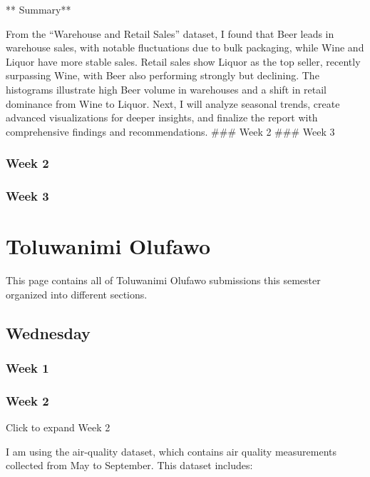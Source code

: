 \documentclass[
  letterpaper,
  DIV=11,
  numbers=noendperiod]{scrreprt}
\begin{document}
** Summary**

From the ``Warehouse and Retail Sales'' dataset, I found that Beer leads
in warehouse sales, with notable fluctuations due to bulk packaging,
while Wine and Liquor have more stable sales. Retail sales show Liquor
as the top seller, recently surpassing Wine, with Beer also performing
strongly but declining. The histograms illustrate high Beer volume in
warehouses and a shift in retail dominance from Wine to Liquor. Next, I
will analyze seasonal trends, create advanced visualizations for deeper
insights, and finalize the report with comprehensive findings and
recommendations. \#\#\# Week 2 \#\#\# Week 3

\subsection{Week 2}\label{week-2-8}

\subsection{Week 3}\label{week-3-7}


\chapter{Toluwanimi Olufawo}\label{toluwanimi-olufawo}

This page contains all of Toluwanimi Olufawo submissions this semester
organized into different sections.

\section{Wednesday}\label{wednesday-3}

\subsection{Week 1}\label{week-1-9}

\subsection{Week 2}\label{week-2-9}

Click to expand Week 2

I am using the air-quality dataset, which contains air quality
measurements collected from May to September. This dataset includes:
\end{document}
